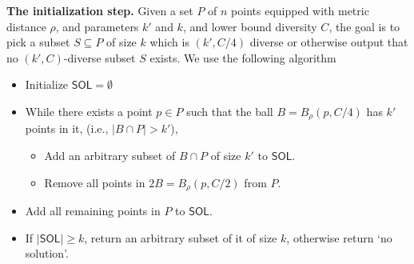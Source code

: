 \noindent\textbf{The initialization step.} Given a set $P$ of $n$ points equipped with metric distance $\rho$, and parameters $k'$ and $k$, and lower bound diversity $C$, the goal is to pick a subset $S\subseteq P$ of size $k$ which is $(k',C/4)$ diverse or otherwise output that no $(k',C)$-diverse subset $S$ exists. We use the following algorithm
\begin{itemize}
    \item Initialize $\mathsf{SOL}=\emptyset$
    \item While there exists a point $p\in P$ such that the ball $B=B_\rho(p,C/4)$ has $k'$ points in it, (i.e., $|B\cap P|>k'$), 
    \begin{itemize}
        \item Add an arbitrary subset of $B\cap P$ of size $k'$ to $\mathsf{SOL}$. 
        \item Remove all points in $2B=B_\rho(p,C/2)$ from $P$.
    \end{itemize}
    \item Add all remaining points in $P$ to $\mathsf{SOL}$.
    \item If $|\mathsf{SOL}|\geq k$, return an arbitrary subset of it of size $k$, otherwise return `no solution'.
\end{itemize}

